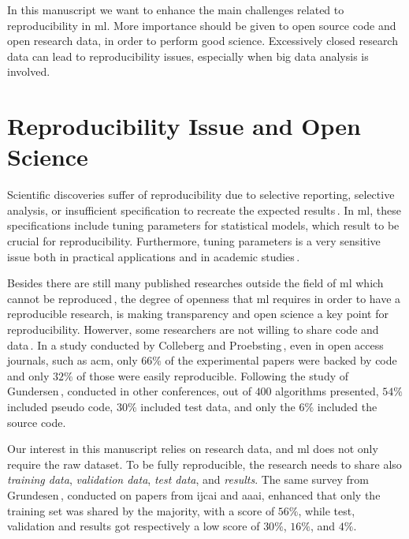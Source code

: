 In this manuscript we want to enhance the main challenges related to reproducibility
in \ac{ml}. More importance should be given to open source
code and open research data, in order to perform good science.
Excessively closed research data can lead to reproducibility issues,
especially when big data analysis is involved.

\section{Reproducibility Issue and Open Science}
Scientific discoveries suffer of reproducibility due
to selective reporting, selective analysis, or insufficient specification to recreate the
expected results\,\cite{aarts2016reproducibility}. 
In \ac{ml}, these specifications include tuning parameters for statistical models, 
which result to be crucial for reproducibility. Furthermore, tuning parameters
is a very sensitive issue both in practical applications and in academic studies\,\cite{birattari2004problem}.

Besides there are still many published researches outside the field of \ac{ml} which cannot be
reproduced\,\cite{begley2012drug, begley2015reproducibility, prinz2011believe},
the degree of openness that \ac{ml} requires in order to have a reproducible research, is making
transparency and open science a key point for reproducibility.
Howerver, some researchers are not willing to share code and data\,\cite{gundersen2018state}.
In a study conducted by Colleberg and Proebsting\,\cite{Collberg:2016:RCS:2897191.2812803},
even in open access journals, such as \ac{acm}, only $66\%$ of the experimental papers
were backed by code and only $32\%$ of those were easily reproducible.
Following the study of Gundersen\,\cite{gundersen2018state},
conducted in other conferences, out of $400$ algorithms presented,
$54\%$ included pseudo code, $30\%$ included test data, and only the $6\%$
included the source code.

Our interest in this manuscript relies on research data, and \ac{ml} does not only require the raw dataset.
To be fully reproducible, the research needs to share also \emph{training data}, \emph{validation data},
\emph{test data}, and \emph{results}. The same survey from
Grundesen\,\cite{gundersen2018state}, conducted on papers from \ac{ijcai} and \ac{aaai}, enhanced that
only the training set was shared by the majority, with a score of $56\%$, while test, validation and results
got respectively a low score of $30\%$, $16\%$, and $4\%$.

